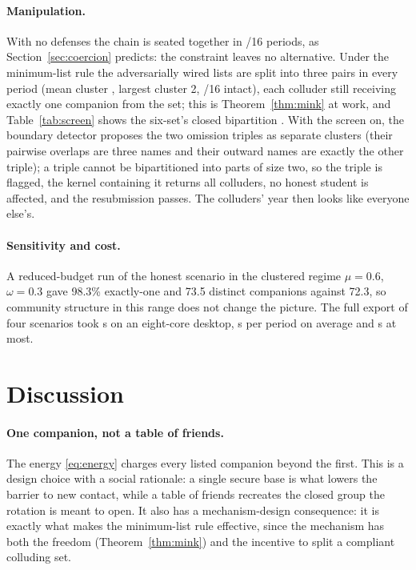 \documentclass[11pt,a4paper]{article}
\theoremstyle{plain}
\theoremstyle{definition}
\theoremstyle{remark}
\begin{document}
\paragraph{Manipulation.} With no defenses the chain is seated together in \NoneIntact/16 periods, as Section~\ref{sec:coercion} predicts: the constraint leaves no alternative. Under the minimum-list rule the adversarially wired lists are split into three pairs in every period (mean cluster \MinFourAvgCluster, largest cluster 2, \MinFourIntact/16 intact), each colluder still receiving exactly one companion from the set; this is Theorem~\ref{thm:mink} at work, and Table~\ref{tab:screen} shows the six-set's closed bipartition \ScreenSplit. With the screen on, the boundary detector proposes the two omission triples as separate clusters (their pairwise overlaps are three names and their outward names are exactly the other triple); a triple cannot be bipartitioned into parts of size two, so the triple \ScreenFlaggedSet{} is flagged, the kernel containing it returns all \ScreenReturned{} colluders, no honest student is affected, and the resubmission passes. The colluders' year then looks like everyone else's.

\paragraph{Sensitivity and cost.} A reduced-budget run of the honest scenario in the clustered regime $\mu = 0.6$, $\omega = 0.3$ gave 98.3\% exactly-one and 73.5 distinct companions against 72.3, so community structure in this range does not change the picture. The full export of four scenarios took \ExportSeconds{} s on an eight-core desktop, \MeanSolve{} s per period on average and \MaxSolve{} s at most.

\section{Discussion}
\label{sec:discussion}

\paragraph{One companion, not a table of friends.} The energy \eqref{eq:energy} charges every listed companion beyond the first. This is a design choice with a social rationale: a single secure base is what lowers the barrier to new contact, while a table of friends recreates the closed group the rotation is meant to open. It also has a mechanism-design consequence: it is exactly what makes the minimum-list rule effective, since the mechanism has both the freedom (Theorem~\ref{thm:mink}) and the incentive to split a compliant colluding set.
\end{document}
